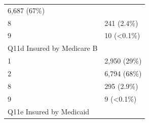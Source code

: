 \documentclass[]{article}
\begin{document}
\begin{longtable}[]{@{}ll@{}}
\begin{minipage}[t]{0.23\columnwidth}
6,687 (67\%)\strut
\end{minipage}\tabularnewline
\begin{minipage}[t]{0.71\columnwidth}\raggedright
8\strut
\end{minipage} & \begin{minipage}[t]{0.23\columnwidth}\raggedright
241 (2.4\%)\strut
\end{minipage}\tabularnewline
\begin{minipage}[t]{0.71\columnwidth}\raggedright
9\strut
\end{minipage} & \begin{minipage}[t]{0.23\columnwidth}\raggedright
10 (\textless{}0.1\%)\strut
\end{minipage}\tabularnewline
\begin{minipage}[t]{0.71\columnwidth}\raggedright
Q11d Insured by Medicare B\strut
\end{minipage} & \begin{minipage}[t]{0.23\columnwidth}\raggedright
\strut
\end{minipage}\tabularnewline
\begin{minipage}[t]{0.71\columnwidth}\raggedright
1\strut
\end{minipage} & \begin{minipage}[t]{0.23\columnwidth}\raggedright
2,950 (29\%)\strut
\end{minipage}\tabularnewline
\begin{minipage}[t]{0.71\columnwidth}\raggedright
2\strut
\end{minipage} & \begin{minipage}[t]{0.23\columnwidth}\raggedright
6,794 (68\%)\strut
\end{minipage}\tabularnewline
\begin{minipage}[t]{0.71\columnwidth}\raggedright
8\strut
\end{minipage} & \begin{minipage}[t]{0.23\columnwidth}\raggedright
295 (2.9\%)\strut
\end{minipage}\tabularnewline
\begin{minipage}[t]{0.71\columnwidth}\raggedright
9\strut
\end{minipage} & \begin{minipage}[t]{0.23\columnwidth}\raggedright
9 (\textless{}0.1\%)\strut
\end{minipage}\tabularnewline
\begin{minipage}[t]{0.71\columnwidth}\raggedright
Q11e Insured by Medicaid\strut
\end{minipage} & \begin{minipage}[t]{0.23\columnwidth}\raggedright

\end{minipage}
\end{longtable}
\end{document}
